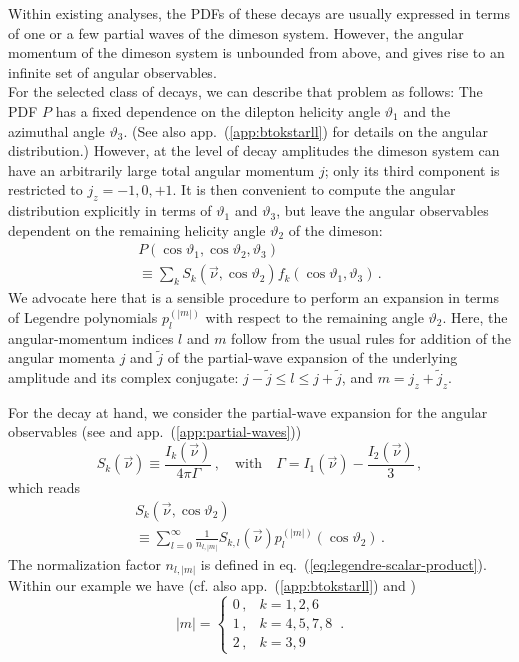 \documentclass[aps,nofootinbib,preprintnumbers,prd,twocolumn]{revtex4-1}
\newcommand{\nuvec}{\vec{\nu}}
\newcommand{\refapp}[1]{app.~(\ref{app:#1})}
\newcommand{\refeq}[1]{eq.~(\ref{eq:#1})}
\renewcommand{\theta}{\vartheta}
\begin{document}
Within existing analyses, the PDFs of these decays are usually expressed in terms of one or a few
partial waves of the dimeson system. However, the angular momentum of the dimeson system is unbounded
from above, and gives rise to an infinite set of angular observables.\\

For the selected class of decays, we can describe that problem as follows: The
PDF $P$ has a fixed dependence on the dilepton helicity angle $\theta_1$ and
the azimuthal angle $\theta_3$. (See also \refapp{btokstarll} for details on
the angular distribution.) However, at the level of decay amplitudes the
dimeson system can have an arbitrarily large total angular momentum $j$; only
its third component is restricted to $j_z = -1,0,+1$.  It is then convenient to
compute the angular distribution explicitly in terms of $\theta_1$ and
$\theta_3$, but leave the angular observables dependent on the remaining
helicity angle $\theta_2$ of the dimeson:
\begin{multline}
    P(\cos\theta_1,\cos\theta_2,\theta_3)\\
        \equiv \sum_k S_k(\nuvec,\cos\theta_2) f_k(\cos\theta_1,\theta_3)\,.
\end{multline}
We advocate here that is a sensible procedure to
perform an expansion in terms of Legendre polynomials $p_{l}^{(|m|)}$ with
respect to the remaining angle $\theta_2$. Here, the angular-momentum indices
$l$ and $m$ follow from the usual rules for addition of the angular momenta $j$
and $\tilde{j}$ of the partial-wave expansion of the underlying amplitude and
its complex conjugate: $j - \tilde{j} \leq l \leq j + \tilde{j}$, and $m = j_z
+ \tilde{j}_z$.

For the decay at hand, we consider the partial-wave expansion for the angular observables (see \cite{Lee:1992ih} and \refapp{partial-waves})
\begin{equation}
    S_k(\vec{\nu}) \equiv \frac{I_k(\nuvec)}{4\pi \Gamma}\,,\quad\text{with}\quad \Gamma = I_1(\nuvec) - \frac{I_2(\nuvec)}{3}\,,
\end{equation}
which reads
\begin{multline}
    \label{eq:expansion}
    S_{k}(\vec{\nu},\cos\theta_2) \\
        \equiv \sum_{l=0}^\infty \frac{1}{n_{l,|m|}} S_{k,l}(\vec{\nu}) p_{l}^{(|m|)}(\cos\theta_2)\,.
\end{multline}
The normalization factor $n_{l,|m|}$ is defined in \refeq{legendre-scalar-product}. Within our
example we have (cf. also \refapp{btokstarll} and \cite{Lee:1992ih})
\begin{equation}
    |m| = \begin{cases}
        0\,, & k = 1,2,6\\
        1\,, & k = 4,5,7,8\\
        2\,, & k = 3,9
    \end{cases}\,.
\end{equation}
\end{document}
